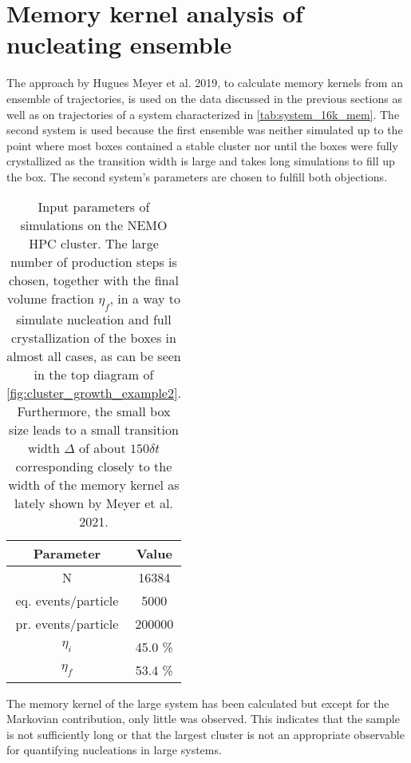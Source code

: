 \section{Memory kernel analysis of nucleating ensemble}
\label{sec:memory_kernels}
The approach by Hugues Meyer et al. 2019\cite{Meyer2019a}, to calculate memory kernels from an ensemble of trajectories, is used on the data discussed in the previous sections as well as on trajectories of a system characterized in \autoref{tab:system_16k_mem}. The second system is used because the first ensemble was neither simulated up to the point where most boxes contained a stable cluster nor until the boxes were fully crystallized as the transition width is large and takes long simulations to fill up the box. The second system's parameters are chosen to fulfill both objections.\\
\begin{table}[ht]
\centering
\begin{tabular}{c|c}
Parameter & Value \\ \hline
N & 16384 \\
eq. events/particle & 5000 \\
pr. events/particle & 200000 \\
$\eta_i$ & 45.0 \% \\
$\eta_f$ & 53.4 \% \\
\end{tabular}
\caption[Simulation parameters of data production system with 16384 particles]{Input parameters of simulations on the NEMO HPC cluster. The large number of production steps is chosen, together with the final volume fraction $\eta_f$, in a way to simulate nucleation and full crystallization of the boxes in almost all cases, as can be seen in the top diagram of \autoref{fig:cluster_growth_example2}. Furthermore, the small box size leads to a small transition width $\Delta$ of about $150 \delta t$ corresponding closely to the width of the memory kernel as lately shown by Meyer et al. 2021\cite{Meyer2021}.} 
\label{tab:system_16k_mem}
\end{table}

The memory kernel of the large system has been calculated but except for the Markovian contribution, only little was observed. This indicates that the sample is not sufficiently long or that the largest cluster is not an appropriate observable for quantifying nucleations in large systems.\\

